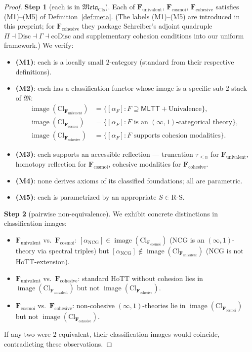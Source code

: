 \documentclass[11pt]{article}
\theoremstyle{plain}
\theoremstyle{definition}
\newcommand{\RS}{\mathrm{R\text{-}S}}
\newcommand{\fM}{\mathfrak{M}}
\newcommand{\Meta}{\mathfrak{Meta}}
\newcommand{\Cl}{\mathrm{Cl}}
\newcommand{\MLTT}{\mathsf{MLTT}}
\DeclareMathOperator{\image}{image}
\begin{document}
\begin{proof}

\textbf{Step 1} (each is in $\Meta_{\mathrm{Cls}}$). Each of $\mathbf{F}_{\mathrm{univalent}}$, $\mathbf{F}_{\mathrm{cosmoi}}$, $\mathbf{F}_{\mathrm{cohesive}}$ satisfies (M1)--(M5) of Definition~\ref{def:meta}. (The labels (M1)--(M5) are introduced in this preprint; for $\mathbf{F}_{\mathrm{cohesive}}$ they package Schreiber's adjoint quadruple $\Pi \dashv \mathrm{Disc} \dashv \Gamma \dashv \mathrm{coDisc}$ and supplementary cohesion conditions into our uniform framework.) We verify:
\begin{itemize}
\item \textbf{(M1)}: each is a locally small $2$-category (standard from their respective definitions).
\item \textbf{(M2)}: each has a classification functor whose image is a specific sub-$2$-stack of $\fM$:
\begin{align*}
\image(\Cl_{\mathbf{F}_{\mathrm{univalent}}}) &= \{[\alpha_F] : F \supseteq \MLTT + \text{Univalence}\}, \\
\image(\Cl_{\mathbf{F}_{\mathrm{cosmoi}}}) &= \{[\alpha_F] : F \text{ is an } (\infty, 1)\text{-categorical theory}\}, \\
\image(\Cl_{\mathbf{F}_{\mathrm{cohesive}}}) &= \{[\alpha_F] : F \text{ supports cohesion modalities}\}.
\end{align*}
\item \textbf{(M3)}: each supports an accessible reflection --- truncation $\tau_{\leq n}$ for $\mathbf{F}_{\mathrm{univalent}}$, homotopy reflection for $\mathbf{F}_{\mathrm{cosmoi}}$, cohesive modalities for $\mathbf{F}_{\mathrm{cohesive}}$.
\item \textbf{(M4)}: none derives axioms of its classified foundations; all are parametric.
\item \textbf{(M5)}: each is parametrized by an appropriate $S \in \RS$.
\end{itemize}

\textbf{Step 2} (pairwise non-equivalence). We exhibit concrete distinctions in classification images:
\begin{itemize}
\item $\mathbf{F}_{\mathrm{univalent}}$ vs.\ $\mathbf{F}_{\mathrm{cosmoi}}$: $[\alpha_{\mathrm{NCG}}] \in \image(\Cl_{\mathbf{F}_{\mathrm{cosmoi}}})$ (NCG is an $(\infty, 1)$-theory via spectral triples) but $[\alpha_{\mathrm{NCG}}] \notin \image(\Cl_{\mathbf{F}_{\mathrm{univalent}}})$ (NCG is not HoTT-extension).
\item $\mathbf{F}_{\mathrm{univalent}}$ vs.\ $\mathbf{F}_{\mathrm{cohesive}}$: standard HoTT without cohesion lies in $\image(\Cl_{\mathbf{F}_{\mathrm{univalent}}})$ but not $\image(\Cl_{\mathbf{F}_{\mathrm{cohesive}}})$.
\item $\mathbf{F}_{\mathrm{cosmoi}}$ vs.\ $\mathbf{F}_{\mathrm{cohesive}}$: non-cohesive $(\infty, 1)$-theories lie in $\image(\Cl_{\mathbf{F}_{\mathrm{cosmoi}}})$ but not $\image(\Cl_{\mathbf{F}_{\mathrm{cohesive}}})$.
\end{itemize}
If any two were $2$-equivalent, their classification images would coincide, contradicting these observations.


\end{proof}
\end{document}
